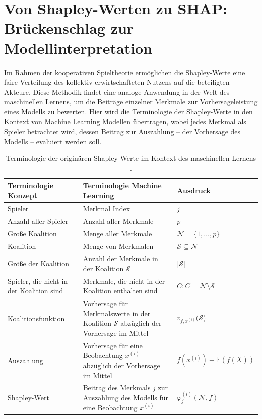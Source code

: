 \chapter{Von Shapley-Werten zu SHAP: Brückenschlag zur Modellinterpretation}

Im Rahmen der kooperativen Spieltheorie ermöglichen die Shapley-Werte eine faire Verteilung des kollektiv 
erwirtschafteten Nutzens auf die beteiligten Akteure. Diese Methodik findet eine analoge Anwendung 
in der Welt des maschinellen Lernens, um die Beiträge einzelner Merkmale zur Vorhersageleistung 
eines Modells zu bewerten. Hier wird die Terminologie der Shapley-Werte in den Kontext von Machine Learning 
Modellen übertragen, wobei jedes Merkmal als \glqq{}Spieler\grqq{} betrachtet wird, dessen Beitrag zur 
\glqq{}Auszahlung\grqq{} – der Vorhersage des Modells – evaluiert werden soll. 

\begin{table}[H]
    \footnotesize
    \begin{tabularx}{\textwidth}{XXX}
    \toprule
    Terminologie Konzept & Terminologie Machine Learning & Ausdruck \\
    \midrule
    Spieler & Merkmal Index & $j$ \\
    Anzahl aller Spieler & Anzahl aller Merkmale & $p$ \\
    Große Koalition & Menge aller Merkmale & $\mathcal{N} = \{1, \ldots, p\}$\\
    Koalition & Menge von Merkmalen & $\mathcal{S} \subseteq \mathcal{N}$ \\
    Größe der Koalition & Anzahl der Merkmale in der Koalition $\mathcal{S}$ & $|\mathcal{S}|$\\
    Spieler, die nicht in der Koalition sind & Merkmale, die nicht in der Koalition enthalten sind & $C: C = \mathcal{N} \setminus \mathcal{S}$ \\
    Koalitionsfunktion & Vorhersage für Merkmalswerte in der Koalition $\mathcal{S}$ abzüglich der Vorhersage im Mittel & $v_{f, x^{(i)}}(\mathcal{S}$)\\
    Auszahlung & Vorhersage für eine Beobachtung $x^{(i)}$ abzüglich der Vorhersage im Mittel & $f(x^{(i)}) -  \mathbb{E}(f(X))$\\
    Shapley-Wert & Beitrag des Merkmals $j$ zur Auszahlung des Modells für eine Beobachtung $x^{(i)}$& $\varphi_j^{(i)}(\mathcal{N}, f)$\\
    \bottomrule
    \end{tabularx}
    \caption{Terminologie der originären Shapley-Werte im Kontext des maschinellen Lernens \cite[S. 26]{Molnar_2023}.}
    \label{tab:shapley_terms}
\end{table}

